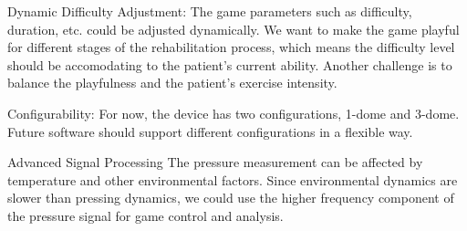 Dynamic Difficulty Adjustment:
The game parameters such as difficulty, duration, etc. could be adjusted dynamically. 
We want to make the game playful for different stages of the rehabilitation process,
which means the difficulty level should be accomodating to the patient's current ability.
Another challenge is to balance the playfulness and the patient's exercise intensity.

Configurability:
For now, the device has two configurations, 1-dome and 3-dome. 
Future software should support different configurations in a flexible way.

Advanced Signal Processing
The pressure measurement can be affected by temperature and other environmental factors. 
Since environmental dynamics are slower than pressing dynamics, we could use 
the higher frequency component of the pressure signal for game control and analysis.








